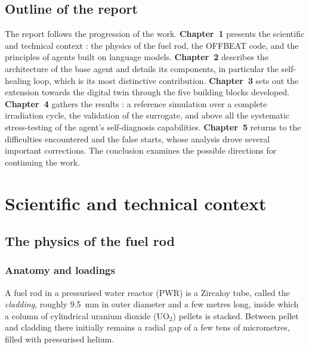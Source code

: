 \documentclass[12pt,a4paper]{report}
\begin{document}
\section*{Outline of the report}

The report follows the progression of the work. \textbf{Chapter~1} presents the
scientific and technical context : the physics of the fuel rod, the OFFBEAT code,
and the principles of agents built on language models. \textbf{Chapter~2}
describes the architecture of the base agent and details its components, in
particular the self-healing loop, which is its most distinctive contribution.
\textbf{Chapter~3} sets out the extension towards the digital twin through the
five building blocks developed. \textbf{Chapter~4} gathers the results : a
reference simulation over a complete irradiation cycle, the validation of the
surrogate, and above all the systematic stress-testing of the agent's
self-diagnosis capabilities. \textbf{Chapter~5} returns to the difficulties
encountered and the false starts, whose analysis drove several important
corrections. The conclusion examines the
possible directions for continuing the work.

\clearpage

\chapter{Scientific and technical context}

\section{The physics of the fuel rod}

\subsection{Anatomy and loadings}

A fuel rod in a pressurised water reactor (PWR) is a Zircaloy tube, called the
\textit{cladding}, roughly \SI{9.5}{\milli\metre} in outer diameter and a few
metres long, inside which a column of cylindrical uranium dioxide
($\mathrm{UO_2}$) pellets is stacked. Between pellet and cladding there
initially remains a radial gap of a few tens of micrometres, filled with
pressurised helium.
\end{document}
